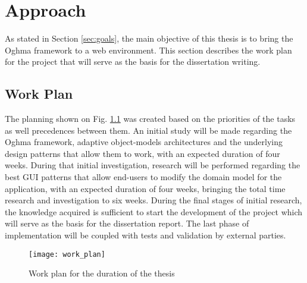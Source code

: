 \chapter{Approach}\label{chap:approach}

As stated in Section \ref{sec:goals}, the main objective of this thesis is to bring the Oghma framework to a web environment. This section describes the work plan for the project that will serve as the basis for the dissertation writing.

\section{Work Plan}\label{sec:work_plan}

The planning shown on Fig. \ref{fig:work_plan} was created based on the priorities of the tasks as well precedences between them. An initial study will be made regarding the Oghma framework, adaptive object-models architectures and the underlying design patterns that allow them to work, with an expected duration of four weeks. During that initial investigation, research will be performed regarding the best GUI patterns that allow end-users to modify the domain model for the application, with an expected duration of four weeks, bringing the total time research and investigation to six weeks. During the final stages of initial research, the knowledge acquired is sufficient to start the development of the project which will serve as the basis for the dissertation report. The last phase of implementation will be coupled with tests and validation by external parties.

\begin{figure}[H]
  \texttt{[image: work\_plan]}
  \caption{Work plan for the duration of the thesis}
  \label{fig:work_plan}
\end{figure}

